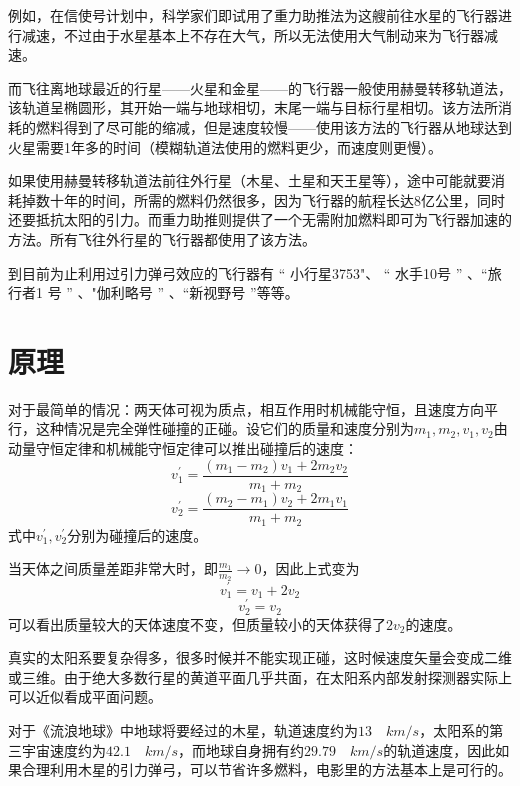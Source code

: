 \documentclass[UTF8,a4paper,10pt]{ctexart}
\begin{document}
\begin{multicols}{2}
    例如，在信使号计划中，科学家们即试用了重力助推法为这艘前往水星的飞行器进行减速，不过由于水星基本上不存在大气，所以无法使用大气制动来为飞行器减速。\par
    而飞往离地球最近的行星——火星和金星——的飞行器一般使用赫曼转移轨道法，该轨道呈椭圆形，其开始一端与地球相切，末尾一端与目标行星相切。该方法所消耗的燃料得到了尽可能的缩减，但是速度较慢——使用该方法的飞行器从地球达到火星需要1年多的时间（模糊轨道法使用的燃料更少，而速度则更慢）。\par
    如果使用赫曼转移轨道法前往外行星（木星、土星和天王星等），途中可能就要消耗掉数十年的时间，所需的燃料仍然很多，因为飞行器的航程长达8亿公里，同时还要抵抗太阳的引力。而重力助推则提供了一个无需附加燃料即可为飞行器加速的方法。所有飞往外行星的飞行器都使用了该方法。\par
    到目前为止利用过引力弹弓效应的飞行器有 “ 小行星3753"、 “ 水手10号 ” 、“旅行者1 号 ” 、"伽利略号 ” 、“新视野号 ”等等。\cite{wiki}\par
\section{原理}
    对于最简单的情况：两天体可视为质点，相互作用时机械能守恒，且速度方向平行，这种情况是完全弹性碰撞的正碰。设它们的质量和速度分别为$m_1,m_2,v_1,v_2$由动量守恒定律和机械能守恒定律可以推出碰撞后的速度：
    \begin{equation}
        v_1^{'} = \frac{(m_1-m_2)v_1 + 2m_2v_2}{m_1+m_2}
    \end{equation}
    \begin{equation}
        v_2^{'} = \frac{(m_2-m_1)v_2 + 2m_1v_1}{m_1+m_2}
    \end{equation}
    式中$v_1^{'},v_2^{'}$分别为碰撞后的速度。\par
    当天体之间质量差距非常大时，即$\frac{m_1}{m_2} \to 0$，因此上式变为
    \begin{equation}
        v_1^{'} = v_1 + 2v_2
    \end{equation}
    \begin{equation}
        v_2^{'} = v_2
    \end{equation}
    可以看出质量较大的天体速度不变，但质量较小的天体获得了$2v_2$的速度。\par
    真实的太阳系要复杂得多，很多时候并不能实现正碰，这时候速度矢量会变成二维或三维。由于绝大多数行星的黄道平面几乎共面，在太阳系内部发射探测器实际上可以近似看成平面问题。\par
    对于《流浪地球》中地球将要经过的木星，轨道速度约为$13\quad km/s$，太阳系的第三宇宙速度约为$42.1\quad km/s$，而地球自身拥有约$29.79\quad km/s$的轨道速度，因此如果合理利用木星的引力弹弓，可以节省许多燃料，电影里的方法基本上是可行的。
\end{multicols}


\end{document}
